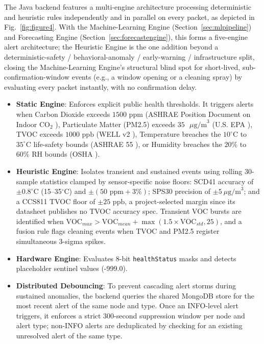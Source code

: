 \documentclass[conference]{IEEEtran}
\begin{document}
The Java backend features a multi-engine architecture processing deterministic and heuristic rules independently and in parallel on every packet, as depicted in Fig.~\ref{fig:figure4}. With the Machine-Learning Engine (Section~\ref{sec:mlpipeline}) and Forecasting Engine (Section~\ref{sec:forecastengine}), this forms a five-engine alert architecture; the Heuristic Engine is the one addition beyond a deterministic-safety / behavioral-anomaly / early-warning / infrastructure split, closing the Machine-Learning Engine's structural blind spot for short-lived, sub-confirmation-window events (e.g., a window opening or a cleaning spray) by evaluating every packet instantly, with no confirmation delay.
\begin{itemize}
\setlength{\itemsep}{0pt}
\item \textbf{Static Engine}: Enforces explicit public health thresholds. It triggers alerts when Carbon Dioxide exceeds $1500\text{ ppm}$ (ASHRAE Position Document on Indoor CO$_2$ \cite{b15}), Particulate Matter (PM2.5) exceeds $35\text{ }\mu\text{g/m}^3$ (U.S. EPA \cite{b4}), TVOC exceeds $1000\text{ ppb}$ (WELL v2 \cite{b5}), Temperature breaches the $10^\circ\text{C}$ to $35^\circ\text{C}$ life-safety bounds (ASHRAE 55 \cite{b1}), or Humidity breaches the $20\%$ to $60\%$ RH bounds (OSHA \cite{b14}).
\item \textbf{Heuristic Engine}: Isolates transient and sustained events using rolling 30-sample statistics clamped by sensor-specific noise floors: SCD41 accuracy \cite{b11} of $\pm0.8^\circ\text{C}$ (15--35$^\circ$C) and $\pm(50\text{ ppm} + 3\%)$; SPS30 precision \cite{b13} of $\pm5\ \mu\text{g/m}^3$; and a CCS811 TVOC floor of $\pm25\text{ ppb}$, a project-selected margin since its datasheet \cite{b12} publishes no TVOC accuracy spec. Transient VOC bursts are identified when $ \text{VOC}_{max} > \text{VOC}_{mean} + \max(1.5 \times \text{VOC}_{std}, 25) $, and a fusion rule flags cleaning events when TVOC and PM2.5 register simultaneous 3-sigma spikes.
\item \textbf{Hardware Engine}: Evaluates 8-bit \texttt{healthStatus} masks and detects placeholder sentinel values (-999.0).
\item \textbf{Distributed Debouncing}: To prevent cascading alert storms during sustained anomalies, the backend queries the shared MongoDB store for the most recent alert of the same node and type. Once an INFO-level alert triggers, it enforces a strict 300-second suppression window per node and alert type; non-INFO alerts are deduplicated by checking for an existing unresolved alert of the same type.
\end{itemize}
\end{document}
